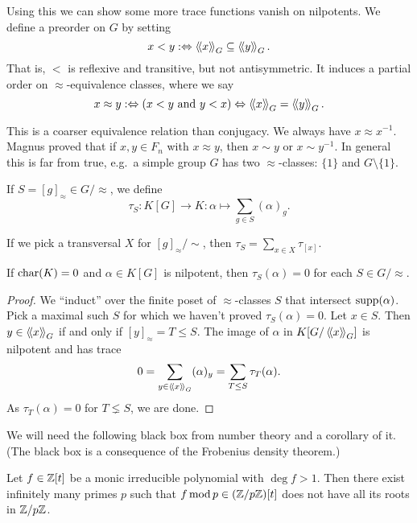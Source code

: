 Using this we can show some more trace functions vanish on nilpotents.
We define a preorder on $G$ by setting \[
    x < y :\Leftrightarrow \left\langle\!\left\langle x \right\rangle\!\right\rangle_G \subseteq \left\langle\!\left\langle y \right\rangle\!\right\rangle_G.
\] That is, $<$ is reflexive and transitive, but not antisymmetric.
It induces a partial order on $\approx$-equivalence classes, where we say \[
    x \approx y :\Leftrightarrow (x < y \text{ and } y < x) \Leftrightarrow \left\langle\!\left\langle x \right\rangle\!\right\rangle_G = \left\langle\!\left\langle y \right\rangle\!\right\rangle_G.
\]

\begin{remark}
    This is a coarser equivalence relation than conjugacy.
    We always have $x \approx x^{-1}$.
    Magnus proved that if $x, y \in F_n$ with $x \approx y$, then $x \sim y$ or $x \sim y^{-1}$.
    In general this is far from true, e.g.\ a simple group $G$ has two $\approx$-classes: $\{1\}$ and $G \setminus \{1\}$.
\end{remark}

If $S = [g]_\approx \in G / {\approx}$, we define \[
    \tau_S \colon K[G] \to K \colon \alpha \mapsto \sum_{g \in S} (\alpha)_g.
\]

\begin{remark}
    If we pick a transversal $X$ for $[g]_\approx / {\sim}$, then $\tau_S = \sum_{x \in X} \tau_{[x]}$.
\end{remark}

\begin{proposition}
    If $\mathrm{char}(K) = 0$ and $\alpha \in K[G]$ is nilpotent, then $\tau_S(\alpha) = 0$ for each $S \in G / {\approx}$.
\end{proposition}

\begin{proof}
    We ``induct'' over the finite poset of $\approx$-classes $S$ that intersect $\operatorname{supp}(\alpha)$.
    Pick a maximal such $S$ for which we haven't proved $\tau_S(\alpha) = 0$.
    Let $x \in S$.
    Then $y \in \left\langle\!\left\langle x \right\rangle\!\right\rangle_G$ if and only if $[y]_\approx = T \leq S$.
    The image of $\alpha$ in $K[G / \left\langle\!\left\langle x \right\rangle\!\right\rangle_G]$ is nilpotent and has trace \[
        0 = \sum_{y \in \left\langle\!\left\langle x \right\rangle\!\right\rangle_G} (\alpha)_y = \sum_{T \leq S} \tau_T(\alpha).
    \] As $\tau_T(\alpha) = 0$ for $T \lneq S$, we are done.
\end{proof}

We will need the following black box from number theory and a corollary of it.
(The black box is a consequence of the Frobenius density theorem.)

\begin{proposition}
    Let $f \in \mathbb{Z}[t]$ be a monic irreducible polynomial with $\deg f > 1$.
    Then there exist infinitely many primes $p$ such that $f \operatorname{mod} p \in (\mathbb{Z} / p \mathbb{Z}) [t]$ does not have all its roots in $\mathbb{Z} / p\mathbb{Z}$.
\end{proposition}

